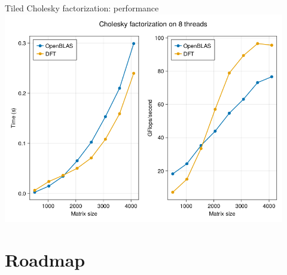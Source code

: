 \documentclass{beamer}
\begin{document}
\begin{frame}{Tiled Cholesky factorization: performance}
\centering\includegraphics[width=0.92\textwidth]{Cholesky_perf.png}
\end{frame}





\section{Roadmap}

\end{document}
